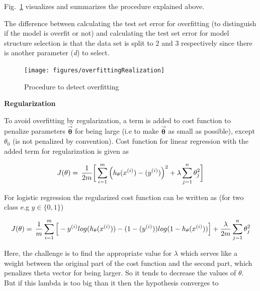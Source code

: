 Fig.~\ref{fig:overfittingRealization} visualizes and summarizes the procedure explained above.

The difference between calculating the test set error for overfitting (to distinguish if the model is overfit or not) and calculating the test set error for model structure selection is that the data set is split to 2 and 3 respectively since there is another parameter (\emph{d}) to select. 

\begin{landscape}
\begin{figure}
\begin{center}
\texttt{[image: figures/overfittingRealization]}    %
\caption{Procedure to detect overfitting} 
\label{fig:overfittingRealization}
\end{center}
\end{figure}
\end{landscape}


\textbf{Regularization}

To avoid overfitting by regularization, a term is added to cost function to penalize parameters $\vec{\bm{\theta}}$ for being large (i.e to make $\vec{\bm{\theta}}$ as small as possible), except ${\theta}_0$ (is not penalized by convention). Cost function for linear regression with the added term for regularization is given as

\begin{equation}{\label{eqn:costFuncRegularized}}
J(\theta)
=\,
\frac{1}{2m} \bigg[ \sum\limits_{i=1}^{m} \Big(h_\theta(x^{(i)}) - (y^{(i)})\Big)^2 +\lambda \sum\limits_{j=1}^{n} \theta_j^2 \bigg] 
\end{equation} 

For logistic regression the regularized cost function can be written as (for two class e.g $y \in \{0,1\}$)

\begin{equation}{\label{eqn:costFuncLogisticRegression}}
J(\theta)
=\,
\frac{1}{m} \sum\limits_{i=1}^{m} \Big[-y^{(i)}log(h_\theta(x^{(i)})) - (1-(y^{(i)}))log(1-h_\theta(x^{(i)}))\Big] +\frac{\lambda}{2m} \sum\limits_{j=1}^{n} \theta_j^2
\end{equation} 

Here, the challenge is to find the appropriate value for $\lambda$ which serves like a weight between the original part of the cost function and the second part, which penalizes theta vector for being larger. 
So it tends to decrease the values of $\theta$. But if this lambda is too big than it then the hypothesis converges to  

